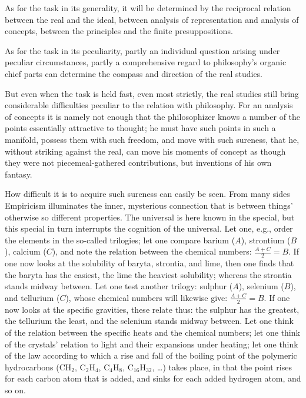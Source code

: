 \documentclass[12pt]{book}
\begin{document}
As for the task in its generality, it will be determined by the reciprocal relation between the
real and the ideal, between analysis of representation and analysis of concepts, between the
principles and the finite presuppositions.

As for the task in its peculiarity, partly an individual question arising under peculiar
circumstances, partly a comprehensive regard to philosophy's organic chief parts can determine
the compass and direction of the real studies.

But even when the task is held fast, even most strictly, the real studies still bring
considerable difficulties peculiar to the relation with philosophy. For an analysis of concepts
it is namely not enough that the philosophizer knows a number of the points essentially attractive
to thought; he must have such points in such a manifold, possess them with such freedom, and move
with such sureness, that he, without striking against the real, can move his moments of concept as
though they were not piecemeal-gathered contributions, but inventions of his own fantasy.

How difficult it is to acquire such sureness can easily be seen. From many sides Empiricism
illuminates the inner, mysterious connection that is between things' otherwise so different
properties. The universal is here known in the special, but this special in turn interrupts the
cognition of the universal. Let one, e.g., order the elements in the so-called trilogies; let one
compare barium ($A$), strontium ($B$), calcium ($C$), and note the relation between the chemical
numbers: $\frac{A+C}{2}=B$. If one now looks at the solubility of
baryta, strontia, and lime, then one finds that the baryta has the easiest, the lime the heaviest
solubility; whereas the strontia stands midway between. Let one test another trilogy: sulphur
($A$), selenium ($B$), and tellurium ($C$), whose chemical numbers will likewise give:
$\frac{A+C}{2}=B$. If one now looks at the specific gravities, these relate thus: the sulphur has
the greatest, the tellurium the least, and the selenium stands midway between. Let one think of
the relation between the specific heats and the chemical numbers; let one think of the crystals'
relation to light and their expansions under heating; let one think of the law according to which
a rise and fall of the boiling point of the polymeric hydrocarbons ($\mathrm{CH_2}$,
$\mathrm{C_2H_4}$, $\mathrm{C_4H_8}$, $\mathrm{C_{16}H_{32}}$, \ldots) takes place, in that the
point rises for each carbon atom that is added, and sinks for each added hydrogen atom, and so on.
\end{document}
